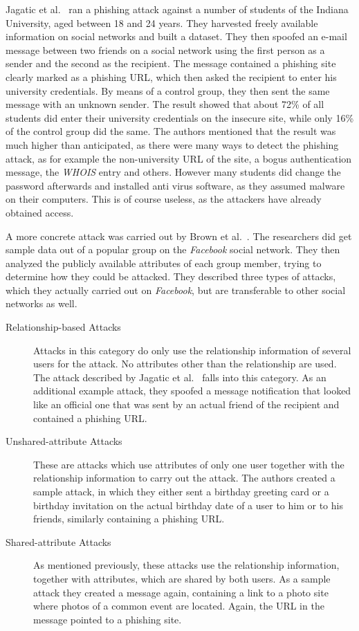 Jagatic et al.~\cite{jagatic2007} ran a phishing attack against a number of
students of the Indiana University, aged between 18 and 24 years. They
harvested freely available information on social networks and built a dataset.
They then spoofed an e-mail message between two friends on a social network
using the first person as a sender and the second as the recipient. The message
contained a phishing site clearly marked as a phishing URL, which then asked
the recipient to enter his university credentials. By means of a control group,
they then sent the same message with an unknown sender. The result showed that
about 72\% of all students did enter their university credentials on the
insecure site, while only 16\% of the control group did the same. The authors
mentioned that the result was much higher than anticipated, as there were many
ways to detect the phishing attack, as for example the non-university URL of
the site, a bogus authentication message, the \textit{WHOIS} entry and others.
However many students did change the password afterwards and installed anti
virus software, as they assumed malware on their computers. This is of course
useless, as the attackers have already obtained access.

A more concrete attack was carried out by Brown et al.~\cite{brown2008}. The
researchers did get sample data out of a popular group on the \textit{Facebook}
social network. They then analyzed the publicly available attributes of each
group member, trying to determine how they could be attacked. They described
three types of attacks, which they actually carried out on \textit{Facebook},
but are transferable to other social networks as well.

\begin{description}

\item[Relationship-based Attacks] Attacks in this category do only use the
relationship information of several users for the attack. No attributes other
than the relationship are used. The attack described by Jagatic et
al.~\cite{jagatic2007} falls into this category. As an additional example
attack, they spoofed a message notification that looked like an official one
that was sent by an actual friend of the recipient and contained a phishing
URL.

\item[Unshared-attribute Attacks]
These are attacks which use attributes of only one user together
with the relationship information to carry out the attack. The authors created
a sample attack, in which they either sent a birthday greeting card or a
birthday invitation on the actual birthday date of a user to him or to his
friends, similarly containing a phishing URL.

\item[Shared-attribute Attacks]
As mentioned previously, these attacks use the relationship information, together with
attributes, which are shared by both users. As a sample attack they created
a message again, containing a link to a photo site where photos of a common
event are located. Again, the URL in the message pointed to a phishing site.
\end{description}

